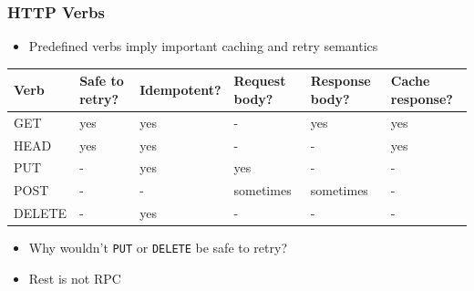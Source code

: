 \documentclass[8pt]{article}
\begin{document}
\subsubsection{HTTP Verbs}
\label{sec:orgd4a2c50}
\begin{itemize}
\item Predefined verbs imply important caching and retry semantics
\end{itemize}
\begin{center}
\begin{tabular}{llllll}
\hline
Verb & Safe to retry? & Idempotent? & Request body? & Response body? & Cache response?\\
\hline
GET & yes & yes & - & yes & yes\\
HEAD & yes & yes & - & - & yes\\
PUT & - & yes & yes & - & -\\
POST & - & - & sometimes & sometimes & -\\
DELETE & - & yes & - & - & -\\
\hline
\end{tabular}
\end{center}

\begin{itemize}
\item Why wouldn't \texttt{PUT} or \texttt{DELETE} be safe to retry?

\item Rest is not RPC
\end{itemize}
\end{document}
